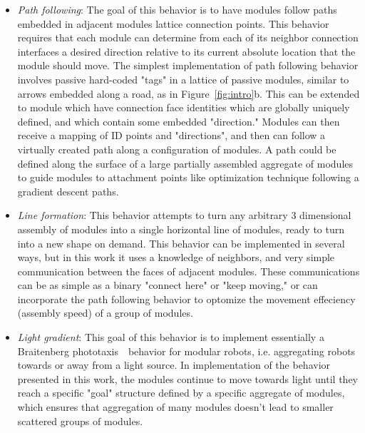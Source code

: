\begin{itemize}
	\item \textit{Path following}: The goal of this behavior is to have modules follow paths embedded in adjacent modules lattice connection points. This behavior requires that  each module can determine from each of its neighbor connection interfaces a desired direction relative to its current absolute location that the module should move. The simplest implementation of path following behavior involves passive hard-coded "tags" in a lattice of passive modules, similar to arrows embedded along a road, as in Figure~\ref{fig:intro}b. This can be extended to module which have connection face identities which are globally uniquely defined, and which contain some embedded "direction." Modules can then receive a mapping of ID points and "directions", and then can follow a virtually created path along a configuration of modules. A path could be defined along the surface of a large partially assembled aggregate of modules to guide modules to attachment points like optimization technique following a gradient descent paths.
	\item \textit{Line formation}: This behavior attempts to turn any arbitrary 3 dimensional assembly of modules into a single horizontal line of modules, ready to turn into a new shape on demand. This behavior can be implemented in several ways, but in this work it uses a knowledge of neighbors, and very simple communication between the faces of adjacent modules. These communications can be as simple as a binary "connect here" or "keep moving," or can incorporate the path following behavior to optomize the movement effeciency (assembly speed) of a group of modules.
	\item \textit{Light gradient}: This goal of this behavior is to implement essentially a Braitenberg phototaxis~\ behavior for modular robots, i.e. aggregating robots towards or away from a light source. In implementation of the behavior presented in this work, the modules continue to move towards light until they reach a specific "goal" structure defined by a specific aggregate of modules, which ensures that aggregation of many modules doesn't lead to smaller scattered groups of modules.
\end{itemize}

